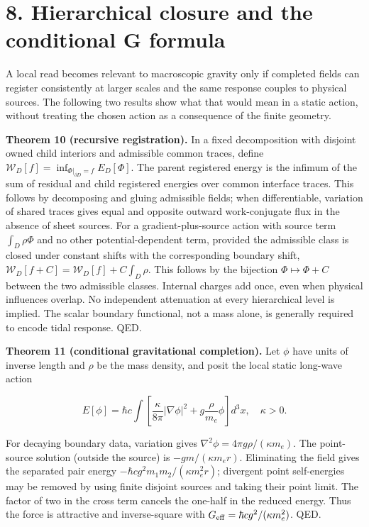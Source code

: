 \documentclass[
  11pt,
]{article}
\begin{document}
\section{8. Hierarchical closure and the conditional G
formula}\label{hierarchical-closure-and-the-conditional-g-formula}

A local read becomes relevant to macroscopic gravity only if completed
fields can register consistently at larger scales and the same response
couples to physical sources. The following two results show what that
would mean in a static action, without treating the chosen action as a
consequence of the finite geometry.

\textbf{Theorem 10 (recursive registration).} In a fixed decomposition
with disjoint owned child interiors and admissible common traces, define
\(\mathcal W_D[f]=\inf_{\Phi|_{\partial D}=f}E_D[\Phi]\). The parent
registered energy is the infimum of the sum of residual and child
registered energies over common interface traces. This follows by
decomposing and gluing admissible fields; when differentiable, variation
of shared traces gives equal and opposite outward work-conjugate flux in
the absence of sheet sources. For a gradient-plus-source action with
source term \(\int_D\rho\Phi\) and no other potential-dependent term,
provided the admissible class is closed under constant shifts with the
corresponding boundary shift,
\(\mathcal W_D[f+C]=\mathcal W_D[f]+C\int_D\rho\). This follows by the
bijection \(\Phi\mapsto\Phi+C\) between the two admissible classes.
Internal charges add once, even when physical influences overlap. No
independent attenuation at every hierarchical level is implied. The
scalar boundary functional, not a mass alone, is generally required to
encode tidal response. QED.

\textbf{Theorem 11 (conditional gravitational completion).} Let \(\phi\)
have units of inverse length and \(\rho\) be the mass density, and posit
the local static long-wave action

\[E[\phi]=\hbar c\int\left[\frac{\kappa}{8\pi}|\nabla\phi|^2+g\frac{\rho}{m_e}\phi\right]d^3x,\quad \kappa>0.\]

For decaying boundary data, variation gives
\(\nabla^2\phi=4\pi g\rho/(\kappa m_e)\). The point-source solution
(outside the source) is \(-g m/(\kappa m_e r)\). Eliminating the field
gives the separated pair energy \(-\hbar c g^2 m_1m_2/(\kappa m_e^2r)\);
divergent point self-energies may be removed by using finite disjoint
sources and taking their point limit. The factor of two in the cross
term cancels the one-half in the reduced energy. Thus the force is
attractive and inverse-square with
\(G_{\rm eff}=\hbar c g^2/(\kappa m_e^2)\). QED.
\end{document}
